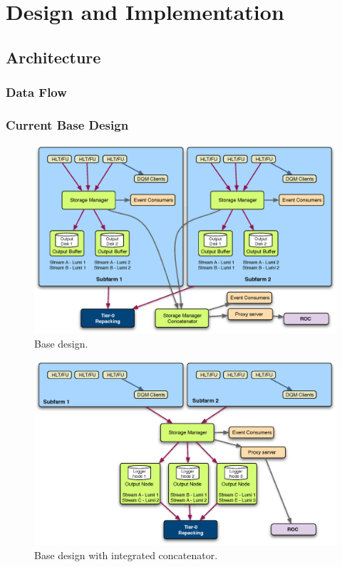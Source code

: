 \section{Design and Implementation}

\subsection{Architecture}

\subsubsection{Data Flow}

\subsubsection{Current Base Design}

\begin{figure}[hbtp]
  \begin{center}
    \includegraphics[width=130mm]{SM_architecture_base.eps}
    \caption{Base design.}
    \label{fig:base_design}
  \end{center}
\end{figure}

\begin{figure}[hbtp]
  \begin{center}
    \includegraphics[width=130mm]{SM_architecture_opt1.eps}
    \caption{Base design with integrated concatenator.}
    \label{fig:opt1_design}
  \end{center}
\end{figure}


